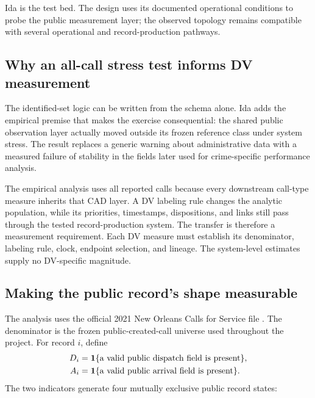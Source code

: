 \documentclass[11pt]{article}
\begin{document}
Ida is the test bed. The design uses its documented operational conditions to probe the public measurement layer; the observed topology remains compatible with several operational and record-production pathways.

\subsection{Why an all-call stress test informs DV measurement}

The identified-set logic can be written from the schema alone. Ida adds the empirical premise that makes the exercise consequential: the shared public observation layer actually moved outside its frozen reference class under system stress. The result replaces a generic warning about administrative data with a measured failure of stability in the fields later used for crime-specific performance analysis.

The empirical analysis uses all reported calls because every downstream call-type measure inherits that CAD layer. A DV labeling rule changes the analytic population, while its priorities, timestamps, dispositions, and links still pass through the tested record-production system. The transfer is therefore a measurement requirement. Each DV measure must establish its denominator, labeling rule, clock, endpoint selection, and lineage. The system-level estimates supply no DV-specific magnitude.

\subsection{Making the public record's shape measurable}

The analysis uses the official 2021 New Orleans Calls for Service file \citep{DataNOLA2021}. The denominator is the frozen public-created-call universe used throughout the project. For record $i$, define
\begin{align}
D_i&=\mathbf{1}\{\text{a valid public dispatch field is present}\},\\
A_i&=\mathbf{1}\{\text{a valid public arrival field is present}\}.
\label{eq:DA}
\end{align}
The two indicators generate four mutually exclusive public record states:
\end{document}
